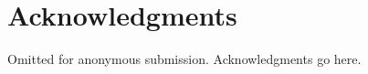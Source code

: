 \renewcommand{\baselinestretch}{1.00}

	\maketitle
	
	
	
	
	
	
	
	
	
	
	\section*{Acknowledgments}
	\ifanonymized
	Omitted for anonymous submission.
	\else
	Acknowledgments go here.
	\fi
	
	\ifroughdraft\clearpage\fi
	\clearpage
	
	
	
	
	

